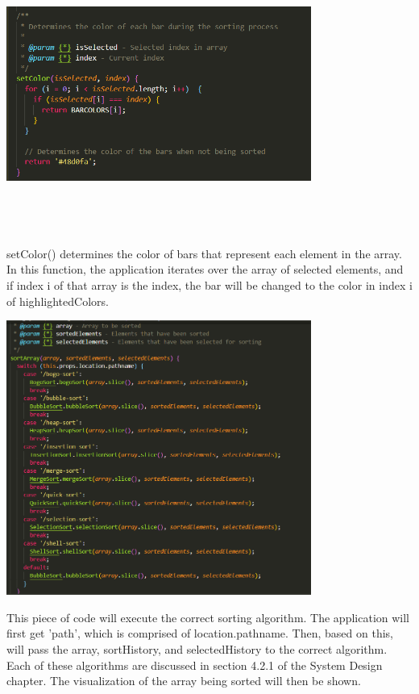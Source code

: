 \begin{center}
    \includegraphics[width=10cm,height=9cm,keepaspectratio]{images/setcolor}
\end{center}
setColor() determines the color of bars that represent each element in the array. In this function, the application iterates over the array of selected elements, and if index i of that array is the index, the bar will be changed to the color in index i of highlightedColors.

\newpage
\begin{center}
    \includegraphics[width=10cm,height=9cm,keepaspectratio]{images/sortArray}
\end{center}
This piece of code will execute the correct sorting algorithm. The application will first get 'path', which is comprised of location.pathname. Then, based on this, will pass the array, sortHistory, and selectedHistory to the correct algorithm. Each of these algorithms are discussed in section 4.2.1 of the System Design chapter. The visualization of the array being sorted will then be shown.

